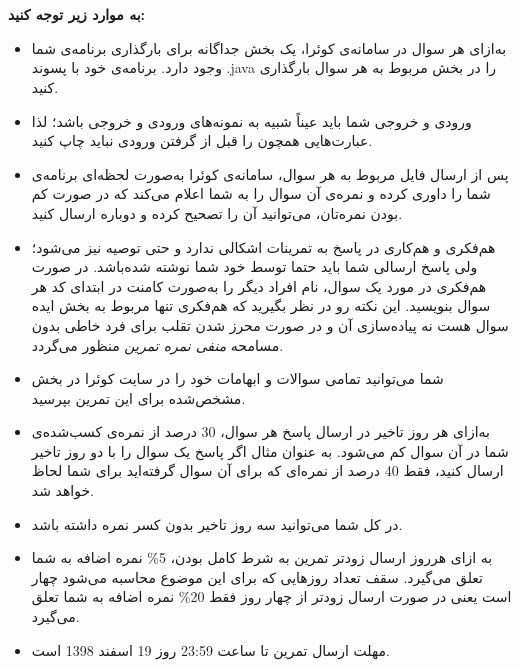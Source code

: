 \documentclass[]{article}
\begin{document}
 \Large \textbf{\\\\
به موارد زیر توجه کنید:}

\begin{itemize}[label=$\ast$]
\item به‌ازای هر سوال در سامانه‌ی کوئرا، یک بخش جداگانه برای بارگذاری برنامه‌ی شما وجود دارد. برنامه‌ی خود با پسوند .java را در بخش مربوط به هر سوال بارگذاری کنید.
\item ورودی و خروجی شما باید عیناً شبیه به نمونه‌های ورودی و خروجی باشد؛ لذا عبارت‌هایی همچون  را قبل از گرفتن ورودی نباید چاپ کنید.
\item پس از ارسال فایل مربوط به هر سوال، سامانه‌ی کوئرا به‌صورت لحظه‌ای برنامه‌ی شما را داوری کرده و نمره‌ی آن سوال را به شما اعلام می‌کند که در صورت کم بودن نمره‌تان، می‌توانید آن را تصحیح کرده و دوباره ارسال کنید.
\item هم‌فکری و هم‌کاری در پاسخ به تمرینات اشکالی ندارد و حتی توصیه نیز می‌شود؛ ولی پاسخ ارسالی شما باید حتما توسط خود شما نوشته شده‌باشد. در صورت هم‌فکری در مورد یک سوال، نام افراد دیگر را به‌صورت کامنت در ابتدای کد هر سوال بنویسید.  این نکته رو در نظر بگیرید که هم‌فکری تنها مربوط به بخش ایده سوال هست نه پیاده‌سازی آن و در صورت محرز شدن تقلب برای فرد خاطی بدون مسامحه \emph{ منفی نمره تمرین}
منظور می‌گردد. 
\item شما می‌توانید تمامی سوالات و ابهامات خود را در سایت کوئرا در بخش مشخص‌شده برای این تمرین بپرسید.
\item به‌ازای هر روز تاخیر در ارسال پاسخ هر سوال، 30 درصد از نمره‌ی کسب‌شده‌ی شما در آن سوال کم می‌شود. به عنوان مثال اگر پاسخ یک سوال را با دو روز تاخیر ارسال کنید، فقط 40 درصد از نمره‌ای که برای آن سوال گرفته‌اید برای شما لحاظ خواهد شد.
\item در کل شما می‌توانید سه روز تاخیر بدون کسر نمره داشته باشد.
\item به ازای هر‌روز ارسال زود‌تر تمرین به شرط کامل بودن، 5\% نمره اضافه به شما تعلق می‌گیرد. سقف تعداد روز‌هایی که  برای این موضوع محاسبه می‌شود چهار است یعنی در صورت ارسال زود‌تر از چهار روز فقط 20\% نمره اضافه به شما تعلق می‌گیرد. 
\item مهلت ارسال تمرین تا ساعت 23:59 روز 19 اسفند 1398 است.
\end{itemize}



\newpage
\end{document}
